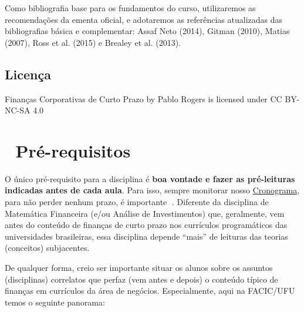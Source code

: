 \documentclass[
  a4paper,
]{book}
\begin{document}
Como bibliografia base para os fundamentos do curso, utilizaremos as
recomendações da ementa oficial, e adotaremos as referências atualizadas
das bibliografias básica e complementar: Assaf Neto (2014), Gitman
(2010), Matias (2007), Ross et al. (2015) e Brealey et al. (2013).

\section*{Licença}\label{licenuxe7a}


Finanças Corporativas de Curto Prazo by Pablo Rogers is licensed under
CC BY-NC-SA 4.0


\chapter*{📇 Pré-requisitos}\label{sec-prework}


O único pré-requisito para a disciplina é \textbf{boa vontade e fazer as
pré-leituras indicadas antes de cada aula}. Para isso, sempre monitorar
nosso \href{http://fccp.phdpablo.com/00-schedule.html}{Cronograma}, para
não perder nenhum prazo, é importante 🤢. Diferente da disciplina de
Matemática Financeira (e/ou Análise de Investimentos) que, geralmente,
vem antes do conteúdo de finanças de curto prazo nos currículos
programáticos das universidades brasileiras, essa disciplina depende
``mais'' de leituras das teorias (conceitos) subjacentes.

De qualquer forma, creio ser importante situar os alunos sobre os
assuntos (disciplinas) correlatos que perfaz (vem antes e depois) o
conteúdo típico de finanças em currículos da área de negócios.
Especialmente, aqui na FACIC/UFU temos o seguinte panorama:
\end{document}
